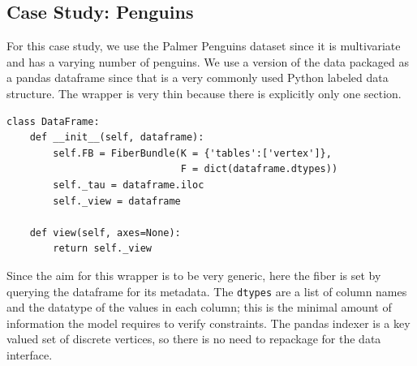 \documentclass[../main.tex]{subfiles}
\begin{document}
\subsection{Case Study: Penguins}
\label{sec:code_case_study}
For this case study, we use the Palmer Penguins dataset\cite{gormanEcologicalSexualDimorphism2014, horstPalmerpenguinsPalmerArchipelago2020} since it is multivariate and has a varying number of penguins. We use a version of the data packaged as a pandas dataframe\cite{nakhaeeMcnakhaeePalmerpenguins2021} since that is a very commonly used Python labeled data structure. The wrapper is very thin because there is explicitly only one section.
\begin{verbatim}
class DataFrame:
    def __init__(self, dataframe):
        self.FB = FiberBundle(K = {'tables':['vertex']},
                              F = dict(dataframe.dtypes))
        self._tau = dataframe.iloc
        self._view = dataframe

    def view(self, axes=None):
        return self._view
\end{verbatim}
Since the aim for this wrapper is to be very generic, here the fiber is set by querying the dataframe for its metadata. The \texttt{dtypes} are a list of column names and the datatype of the values in each column; this is the minimal amount of information the model requires to verify constraints. The pandas indexer is a key valued set of discrete vertices, so there is no need to repackage for the data interface. 
\end{document}
